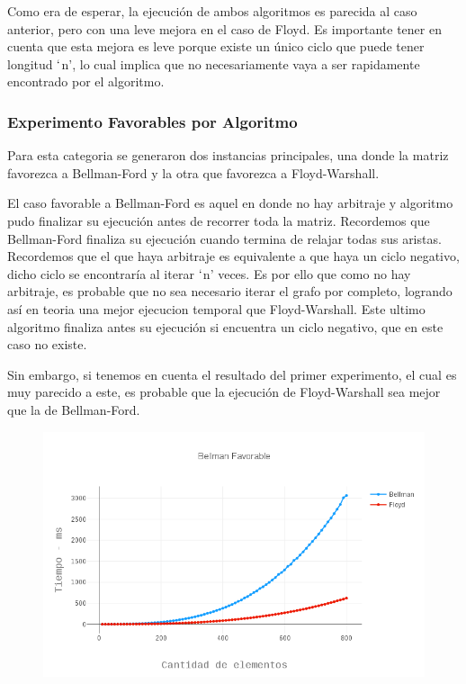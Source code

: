 Como era de esperar, la ejecución de ambos algoritmos es parecida al caso anterior, pero con una leve mejora en el caso de Floyd. Es importante tener en cuenta que esta mejora es leve porque existe un único ciclo que puede tener longitud $`$n', lo cual implica que no necesariamente vaya a ser rapidamente encontrado por el algoritmo.

\subsubsection{Experimento Favorables por Algoritmo} \label{favorables}

Para esta categoria se generaron dos instancias principales, una donde la matriz favorezca a Bellman-Ford y la otra que favorezca a Floyd-Warshall.

 \label{favorableBellmanFord}
El caso favorable a Bellman-Ford es aquel en donde no hay arbitraje y algoritmo pudo finalizar su ejecución antes de recorrer toda la matriz. Recordemos que Bellman-Ford finaliza su ejecución cuando termina de relajar todas sus aristas. Recordemos que el que haya arbitraje es equivalente a que haya un ciclo negativo, dicho ciclo se encontraría al iterar $`$n' veces. Es por ello que como no hay arbitraje, es probable que no sea necesario iterar el grafo por completo, logrando así en teoria una mejor ejecucion temporal que Floyd-Warshall. Este ultimo algoritmo finaliza antes su ejecución si encuentra un ciclo negativo, que en este caso no existe.

Sin embargo, si tenemos en cuenta el resultado del primer experimento, el cual es muy parecido a este, es probable que la ejecución de Floyd-Warshall sea mejor que la de Bellman-Ford.

\begin{figure}[H]
  \begin{center}
	\includegraphics[scale=0.4]{images/experimentos/arbitraje/bellmanFavorable.png}
  \end{center}
\end{figure}

